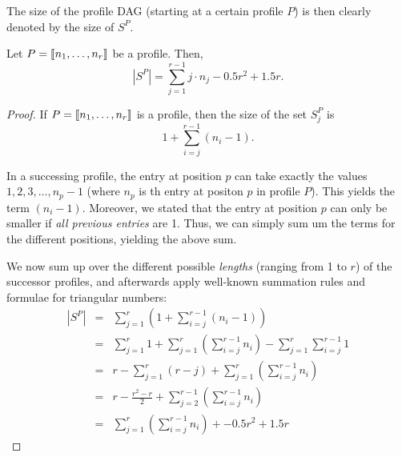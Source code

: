 The size of the profile DAG (starting at a certain profile $P$) is then clearly denoted by the size of $S^P$.

\begin{lemma}
  \label{lem:profile-dags-exact-size}
  Let $P=\left\llbracket n_1,\dots,n_r \right\rrbracket$ be a profile. Then, 
  \begin{equation*}
    \left| S^P \right| = 
    \sum _{j=1}^{r-1} j \cdot n_j 
    -0.5r^2 + 1.5 r.
  \end{equation*}
\end{lemma}

\begin{proof}
  If $P=\left\llbracket n_1,\dots,n_r \right\rrbracket$ is a profile, then the size of the set $S^P_j$ is
  \begin{equation*}
    1+ \sum_{i=j}^{r-1} (n_i-1).
  \end{equation*}
  
  In a successing profile, the entry at position $p$ can take exactly the values $1, 2, 3, \dots, n_p-1$ (where $n_p$ is th entry at positon $p$ in profile $P$). This yields the term $(n_i-1)$. Moreover, we stated that the entry at position $p$ can only be smaller if \emph{all previous entries} are 1. Thus, we can simply sum um the terms for the different positions, yielding the above sum.

  We now sum up over the different possible \emph{lengths} (ranging from 1 to $r$) of the successor profiles, and afterwards apply well-known summation rules and formulae for triangular numbers:
  \begin{eqnarray*}
    \left| S^P \right| & = & \sum_{j=1}^{r} \left( 1+ \sum_{i=j}^{r-1} (n_i-1) \right) \\
    &=& \sum_{j=1}^{r} 1 + \sum_{j=1}^{r} \left( \sum_{i=j}^{r-1} n_i \right) - \sum_{j=1}^{r}\sum_{i=j}^{r-1} 1 \\
    &=&r - \sum_{j=1}^{r}(r-j) + \sum_{j=1}^{r} \left( \sum_{i=j}^{r-1} n_i \right) \\
    &=&r - \frac{r^2-r}{2} + \sum_{j=2}^{r-1} \left( \sum_{i=j}^{r-1} n_i \right) \\
    &=&\sum _{j=1}^{r} \left( \sum _{i=j}^{r-1}n_{{i}} \right) + -0.5r^2 + 1.5 r
  \end{eqnarray*}


\end{proof}

